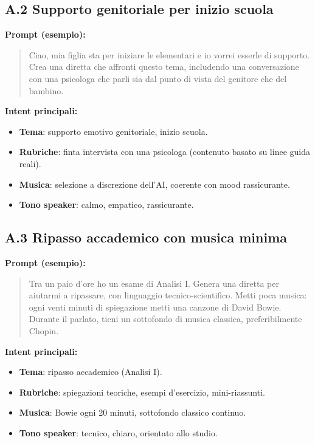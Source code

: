 \documentclass[11pt,a4paper]{article}
\begin{document}
\subsection*{A.2 Supporto genitoriale per inizio scuola}

\textbf{Prompt (esempio):}
\begin{quote}
Ciao, mia figlia sta per iniziare le elementari e io vorrei esserle di supporto. Crea una diretta che affronti questo tema, includendo una conversazione con una psicologa che parli sia dal punto di vista del genitore che del bambino.
\end{quote}

\textbf{Intent principali:}
\begin{itemize}[leftmargin=*]
    \item \textbf{Tema}: supporto emotivo genitoriale, inizio scuola.
    \item \textbf{Rubriche}: finta intervista con una psicologa (contenuto basato su linee guida reali).
    \item \textbf{Musica}: selezione a discrezione dell’AI, coerente con mood rassicurante.
    \item \textbf{Tono speaker}: calmo, empatico, rassicurante.
\end{itemize}

\subsection*{A.3 Ripasso accademico con musica minima}

\textbf{Prompt (esempio):}
\begin{quote}
Tra un paio d’ore ho un esame di Analisi I. Genera una diretta per aiutarmi a ripassare, con linguaggio tecnico-scientifico. Metti poca musica: ogni venti minuti di spiegazione metti una canzone di David Bowie. Durante il parlato, tieni un sottofondo di musica classica, preferibilmente Chopin.
\end{quote}

\textbf{Intent principali:}
\begin{itemize}[leftmargin=*]
    \item \textbf{Tema}: ripasso accademico (Analisi I).
    \item \textbf{Rubriche}: spiegazioni teoriche, esempi d’esercizio, mini-riassunti.
    \item \textbf{Musica}: Bowie ogni 20 minuti, sottofondo classico continuo.
    \item \textbf{Tono speaker}: tecnico, chiaro, orientato allo studio.
\end{itemize}
\end{document}
